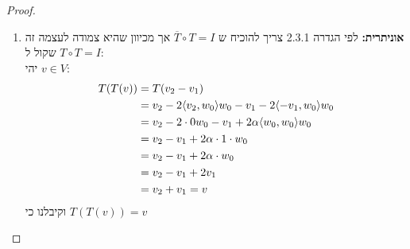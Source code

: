 \documentclass{article}
\begin{document}
\begin{proof}
\begin{enumerate}
\begin{proof}
\begin{align*}
					&= v_1 + v_2 - 2\alpha w_0 \\
					&= v_1 + v_2 - 2 v_1 \\
					&= v_2 - v_1 \\
				\end{align*}
			 \end{proof}
			 וכעת נוכיח שהיא צמודה לעצמה:
			\begin{align*}
				\ang{T(u), v} \\
				&= \ang{u_2 - u_1, v_1 + v_2} \\
				&= \ang{u_2, v_1 + v_2} - \ang{u_1, v_1 + v_2} \\
				&= \ang{u_2, v_1} + \ang{u_2, v_2} - \ang{u_1, v_1} - \ang{u_1, v_2} \\
				&= 0 + \ang{u_2, v_2} - \ang{u_1, v_1} - 0 \\
				&= \ang{u_1, v_2} + \ang{u_2, v_2} - \ang{u_1, v_1} - \ang{u_2, v_1} \\
				&= \ang{u_1, v_2} - \ang{u_1, v_1} + \ang{u_2, v_2} - \ang{u_2, v_1} \\
				&= \ang{u_1, v_2 - v_1} + \ang{u_2, v_2 - v_1} \\
				&= \ang{u_1 + u_2, v_2 - v_1 } \\
				&= \ang{u, T(v)}
			\end{align*}
			\item \textbf{אוניתרית:} לפי הגדרה 2.3.1 צריך להוכיח ש $\overline{T}\circ T = I$ אך מכיוון שהיא צמודה לעצמה זה שקול ל $T\circ T = I$: \\
			יהי $v \in V$:
			\begin{align*}
				T(T(v))
				&= T(v_2 - v_1) \\
				&= v_2 - 2\langle v_2, w_0 \rangle w_0 - v_1 - 2\langle -v_1, w_0 \rangle w_0 \\
				&= v_2 -2 \cdot 0 w_0 - v_1 + 2\alpha\langle w_0, w_0 \rangle w_0 \\
				&= v_2 - v_1 + 2\alpha \cdot 1 \cdot w_0 \\
				&= v_2 - v_1 + 2\alpha\cdot w_0 \\
				&= v_2 - v_1 + 2v_1 \\
				&= v_2 + v_1
				= v
			\end{align*}
			וקיבלנו כי $T(T(v)) = v$
		\end{enumerate}
	\end{proof}
\end{document}
